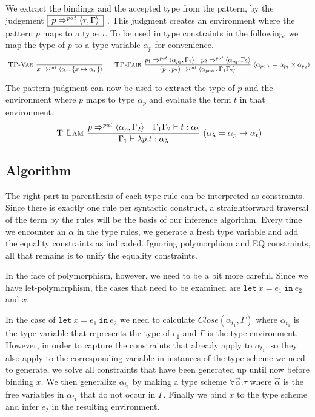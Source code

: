 \documentclass[a4paper]{article}
\newcommand{\s}[1]{\mathtt{#1}}
\newcommand{\sletin}[2]{\s{let\ } #1 \s{\ in\ } #2}
\newcommand{\patbind}{\Rightarrow^{pat}}
\newcommand{\angled}[1]{\langle #1\rangle}
\renewcommand{\rule}[3][]{\ \mbox{\textsc{#1 }}\dfrac{#2}{#3}\ }
\newcommand{\smbox}[1]{
  $\begin{array}{|c|}
    \hline
    #1 \\
    \hline
  \end{array}$
}
\begin{document}
We extract the bindings and the accepted type from the
pattern, by the judgement \smbox{p \patbind \angled{\tau,\Gamma}}. This judgment creates an environment where the pattern $p$ maps to a type $\tau$. To be used in type constraints in the following, we map the type of $p$ to a type variable $\alpha_p$ for convenience.
\[
\rule[TP-Var]{}{x \patbind \angled{\alpha_x,\{x \mapsto \alpha_x\}}}\quad
\rule[TP-Pair]{p_1 \patbind \angled{\alpha_{p_1},\Gamma_1}\quad p_2 \patbind \angled{\alpha_{p_2},\Gamma_2}}
{(p_1, p_2) \patbind \angled{\alpha_{pair},\Gamma_1\Gamma_2}}(\alpha_{pair} = \alpha_{p_1}\times\alpha_{p_2})
\]

The pattern judgment can now be used to extract the type of $p$ and the environment where $p$ maps to type $\alpha_p$ and evaluate the term $t$ in that environment.
\[
\rule[T-Lam]{p \patbind \angled{\alpha_p,\Gamma_2} \quad\Gamma_1\Gamma_2 \vdash t : \alpha_t}{\Gamma_1 \vdash \lambda p.t : \alpha_{\lambda}} (\alpha_\lambda = \alpha_p \to \alpha_t)
\]

\subsection{Algorithm}
\label{typeInference}

The right part in parenthesis of each type rule can be interpreted
as constraints. Since there is exactly one rule per syntactic
construct, a straightforward traversal of the term by the rules
will be the basis of our inference algorithm. Every time we
encounter an $\alpha$ in the type rules, we generate a fresh type
variable and add the equality constraints as indicaded. Ignoring
polymorphism and EQ constraints, all that remains is to unify
the equality constraints.

In the face of polymorphism, however, we need to be a bit more
careful. Since we have let-polymorphism, the cases that need to be
examined are $\sletin{x = e_1}{e_2}$ and $x$.

In the case of $\sletin{x = e_1}{e_2}$ we need to calculate
$Close(\alpha_{t_1},\Gamma)$ where $\alpha_{t_1}$ is the type
variable that represents the type of $e_1$ and $\Gamma$ is the
type environment. However, in order to capture the constraints
that already apply to $\alpha_{t_1}$, so they also apply to
the corresponding variable in instances of the type scheme we
need to generate, we solve all constraints that have been
generated up until now before binding $x$. We then generalize
$\alpha_{t_1}$ by making a type scheme $\forall \vec{\alpha}.\tau$
where $\vec{\alpha}$ is the free variables in $\alpha_{t_1}$ that
do not occur in $\Gamma$. Finally we bind $x$ to the type scheme
and infer $e_2$ in the resulting environment.
\end{document}
